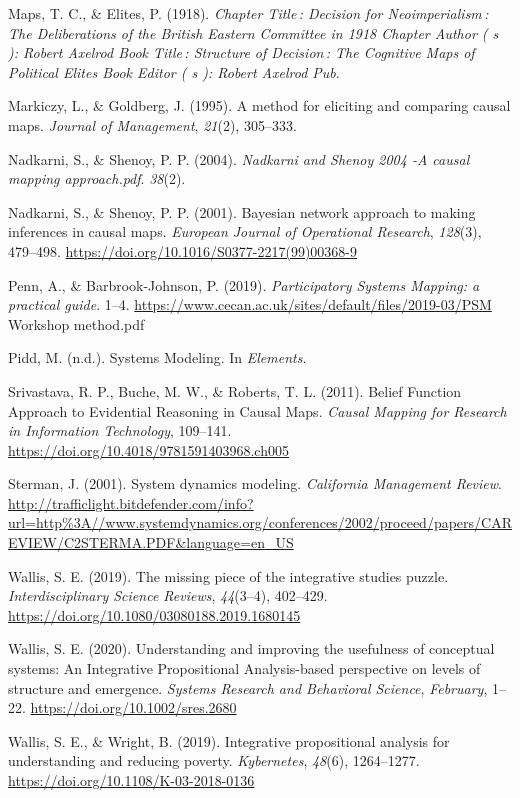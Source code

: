 \documentclass[
]{book}
\begin{document}
Maps, T. C., \& Elites, P. (1918). \emph{Chapter Title\,: Decision for Neoimperialism\,: The Deliberations of the British Eastern Committee in 1918 Chapter Author ( s ): Robert Axelrod Book Title\,: Structure of Decision\,: The Cognitive Maps of Political Elites Book Editor ( s ): Robert Axelrod Pub}.

Markiczy, L., \& Goldberg, J. (1995). A method for eliciting and comparing causal maps. \emph{Journal of Management}, \emph{21}(2), 305--333.

Nadkarni, S., \& Shenoy, P. P. (2004). \emph{Nadkarni and Shenoy 2004 -A causal mapping approach.pdf}. \emph{38}(2).

Nadkarni, S., \& Shenoy, P. P. (2001). Bayesian network approach to making inferences in causal maps. \emph{European Journal of Operational Research}, \emph{128}(3), 479--498. \url{https://doi.org/10.1016/S0377-2217(99)00368-9}

Penn, A., \& Barbrook-Johnson, P. (2019). \emph{Participatory Systems Mapping: a practical guide}. 1--4. \url{https://www.cecan.ac.uk/sites/default/files/2019-03/PSM} Workshop method.pdf

Pidd, M. (n.d.). Systems Modeling. In \emph{Elements}.

Srivastava, R. P., Buche, M. W., \& Roberts, T. L. (2011). Belief Function Approach to Evidential Reasoning in Causal Maps. \emph{Causal Mapping for Research in Information Technology}, 109--141. \url{https://doi.org/10.4018/9781591403968.ch005}

Sterman, J. (2001). System dynamics modeling. \emph{California Management Review}. \url{http://trafficlight.bitdefender.com/info?url=http\%3A//www.systemdynamics.org/conferences/2002/proceed/papers/CAREVIEW/C2STERMA.PDF\&language=en_US}

Wallis, S. E. (2019). The missing piece of the integrative studies puzzle. \emph{Interdisciplinary Science Reviews}, \emph{44}(3--4), 402--429. \url{https://doi.org/10.1080/03080188.2019.1680145}

Wallis, S. E. (2020). Understanding and improving the usefulness of conceptual systems: An Integrative Propositional Analysis-based perspective on levels of structure and emergence. \emph{Systems Research and Behavioral Science}, \emph{February}, 1--22. \url{https://doi.org/10.1002/sres.2680}

Wallis, S. E., \& Wright, B. (2019). Integrative propositional analysis for understanding and reducing poverty. \emph{Kybernetes}, \emph{48}(6), 1264--1277. \url{https://doi.org/10.1108/K-03-2018-0136}

  
\end{document}
